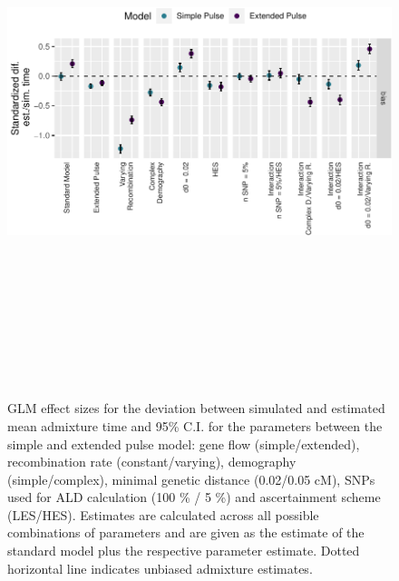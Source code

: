 \documentclass[11pt]{article}
\begin{document}
\begin{figure}
\centering
\includegraphics[width=12cm,height=16cm,keepaspectratio]{ATE_Revisions_files/figure-latex/figResult_3_GLM_SP_and_EP_bias-1.pdf}
\caption{\label{fig:figGLM_deviation} GLM effect sizes for the deviation between simulated and estimated mean admixture time  and 95\% C.I. for the parameters between the simple and extended pulse model: gene flow (simple/extended), recombination rate (constant/varying), demography (simple/complex), minimal genetic distance (0.02/0.05 cM), SNPs used for ALD calculation (100 \% / 5 \%) and ascertainment scheme (LES/HES). Estimates are calculated across all possible combinations of parameters and are given as the estimate of the standard model plus the respective parameter estimate. Dotted horizontal line indicates unbiased admixture estimates.}
\end{figure}
\end{document}
